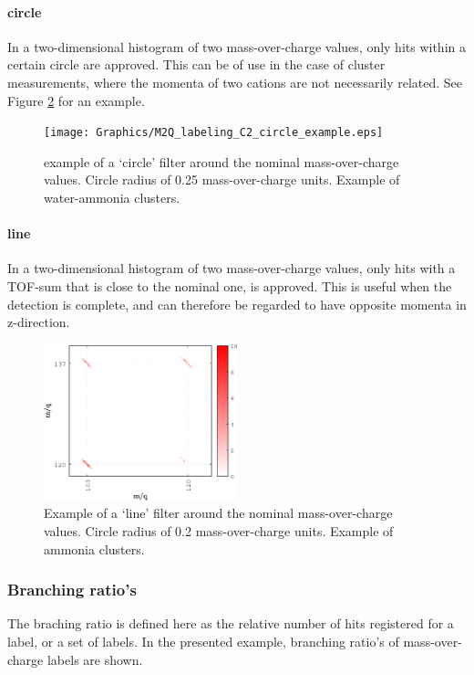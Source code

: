 \paragraph{circle} In a two-dimensional histogram of two mass-over-charge values, only hits within a certain circle are approved. This can be of use in the case of cluster measurements, where the momenta of two cations are not necessarily related. See Figure \ref{labeling_C2} for an example.

\begin{figure}[H]
   \centering
    \centerline{\texttt{[image: Graphics/M2Q\_labeling\_C2\_circle\_example.eps]}}
\caption{example of a `circle' filter around the nominal mass-over-charge values. Circle radius of 0.25 mass-over-charge units. Example of water-ammonia clusters.}
\label{labeling_C2}
\end{figure}

\paragraph{line} 
In a two-dimensional histogram of two mass-over-charge values, only hits with a TOF-sum that is close to the nominal one, is approved. This is useful when the detection is complete, and can therefore be regarded to have opposite momenta in z-direction. 

\begin{figure}[H]
   \centering
    \centerline{\includegraphics[width=0.5\textwidth]{Graphics/M2Q_labeling_C2_line_example.eps}}
\caption{Example of a `line' filter around the nominal mass-over-charge values. Circle radius of 0.2 mass-over-charge units. Example of ammonia clusters.}
\label{labeling_C2}
\end{figure}

\subsubsection{Branching ratio's}
The braching ratio is defined here as the relative number of hits registered for a label, or a set of labels. In the presented example, branching ratio's of mass-over-charge labels are shown. \\

